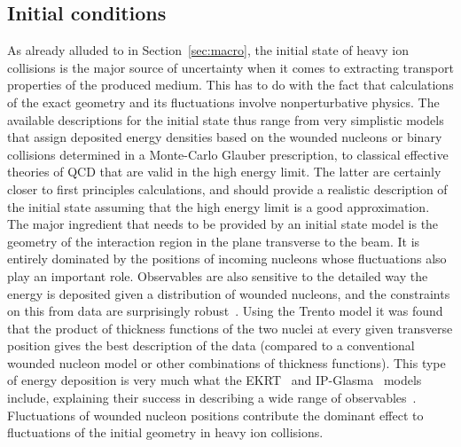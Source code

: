 \subsection{Initial conditions} \label{sec:initialstate}
As already alluded to in Section~\ref{sec:macro}, the initial state of 
  heavy ion collisions is the major source of uncertainty when it comes 
  to extracting transport properties of the produced medium. 
This has to do with the fact that calculations of the exact geometry and 
  its fluctuations involve nonperturbative physics. 
The available descriptions for the initial state thus range from very 
  simplistic models that assign deposited energy densities based on the 
  wounded nucleons or binary collisions determined in a Monte-Carlo 
  Glauber prescription, to classical effective theories of QCD that are 
  valid in the high energy limit. 
The latter are certainly closer to first principles calculations, and 
  should provide a realistic description of the initial state assuming 
  that the high energy limit is a good approximation.
The major ingredient that needs to be provided by an initial state model 
  is the geometry of the interaction region in the plane transverse 
  to the beam. 
It is entirely dominated by the positions of incoming nucleons whose 
  fluctuations also play an important role. 
Observables are also sensitive to the detailed way the energy is deposited 
  given a distribution of wounded nucleons, and the constraints on this 
  from data are surprisingly robust~\cite{Moreland:2018gsh}. 
Using the Trento model it was found that the product of thickness functions 
  of the two nuclei at every given transverse position gives the best description 
  of the data (compared to a conventional wounded nucleon model or other 
  combinations of thickness functions). 
This type of energy deposition is very much what the EKRT~\cite{Niemi:2015qia} 
  and IP-Glasma~\cite{Schenke:2012wb,Schenke:2012fw} models include, explaining 
  their success in describing a wide range of observables~\cite{Niemi:2015qia,Gale:2012rq}.
Fluctuations of wounded nucleon positions contribute the dominant effect to 
  fluctuations of the initial geometry in heavy ion collisions. 
